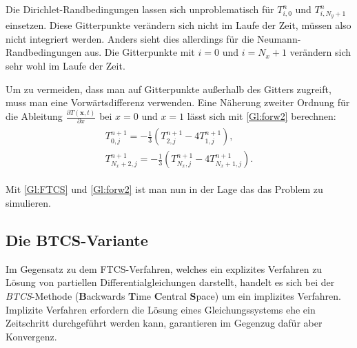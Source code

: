 Die Dirichlet-Randbedingungen lassen sich unproblematisch für $T^{n}_{i,0}$ und $T^{n}_{i,N_y+1}$ einsetzen. Diese Gitterpunkte verändern sich nicht im Laufe der Zeit, müssen also nicht integriert werden.
Anders sieht dies allerdings für die Neumann-Randbedingungen aus. Die Gitterpunkte mit $i=0$ und $i=N_x+1$ verändern sich sehr wohl im Laufe der Zeit.

Um zu vermeiden, dass man auf Gitterpunkte außerhalb des Gitters zugreift, muss man eine Vorwärtsdifferenz verwenden.
Eine Näherung zweiter Ordnung für die Ableitung $\frac{\partial T(\boldsymbol x,t)}{\partial x}$ bei $x=0$ und $x=1$ lässt sich mit \cref{Gl:forw2} berechnen\cite{numstr}:
\begin{align}
  \begin{split}
  T^{n+1}_{0,j} = -\frac{1}{3} \left( T^{n+1}_{2,j}-4T^{n+1}_{1,j}\right), \\
  T^{n+1}_{N_x+2,j} = -\frac{1}{3} \left( T^{n+1}_{N_x,j}-4T^{n+1}_{N_x+1,j}\right).
\end{split}\label{Gl:forw2}
\end{align}

Mit \cref{Gl:FTCS} und \cref{Gl:forw2} ist man nun in der Lage das das Problem zu simulieren.

\subsection{Die BTCS-Variante}
Im Gegensatz zu dem FTCS-Verfahren, welches ein explizites Verfahren zu Lösung von partiellen Differentialgleichungen darstellt, handelt es sich bei der \emph{BTCS}-Methode (\textbf{B}ackwards \textbf{T}ime \textbf{C}entral \textbf{S}pace) um ein implizites Verfahren.
Implizite Verfahren erfordern die Lösung eines Gleichungssystems ehe ein Zeitschritt durchgeführt werden kann, garantieren im Gegenzug dafür aber Konvergenz.

